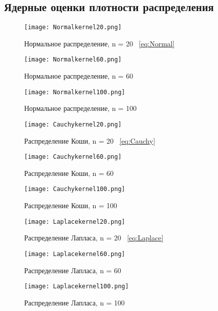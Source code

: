 \documentclass[12pt,a4paper]{scrartcl}
\begin{document}
\subsection{Ядерные оценки плотности распределения}
\begin{figure}[H]
  \centering
  \texttt{[image: Normalkernel20.png]}
  \caption{Нормальное распределение, n = 20 ~\eqref{eq:Normal}}
\end{figure}

\begin{figure}[H]
  \centering
  \texttt{[image: Normalkernel60.png]}
  \caption{Нормальное распределение, n = 60}
\end{figure}

\begin{figure}[H]
  \centering
  \texttt{[image: Normalkernel100.png]}
  \caption{Нормальное распределение, n = 100}
\end{figure}

\begin{figure}[H]
  \centering
  \texttt{[image: Cauchykernel20.png]}
  \caption{Распределение Коши, n = 20 ~\eqref{eq:Cauchy}}
\end{figure}

\begin{figure}[H]
  \centering
  \texttt{[image: Cauchykernel60.png]}
  \caption{Распределение Коши, n = 60}
\end{figure}

\begin{figure}[H]
  \centering
  \texttt{[image: Cauchykernel100.png]}
  \caption{Распределение Коши, n = 100}
\end{figure}

\begin{figure}[H]
\centering
  \texttt{[image: Laplacekernel20.png]}
  \caption{Распределение Лапласа, n = 20 ~\eqref{eq:Laplace}}
\end{figure}

\begin{figure}[H]
\centering
  \texttt{[image: Laplacekernel60.png]}
  \caption{Распределение Лапласа, n = 60}
\end{figure}

\begin{figure}[H]
\centering
  \texttt{[image: Laplacekernel100.png]}
  \caption{Распределение Лапласа, n = 100}
\end{figure}
\end{document}
